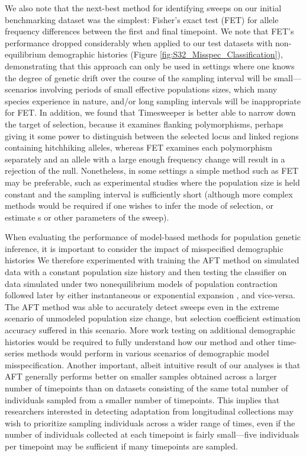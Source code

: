 We also note that the next-best method for identifying sweeps on our initial benchmarking dataset was the simplest: Fisher’s exact test (FET) for allele frequency differences between the first and final timepoint. We note that FET’s performance dropped considerably when applied to our test datasets with non-equilibrium demographic histories (Figure \ref{fig:S32_Misspec_Classification}), demonstrating that this approach can only be used in settings where one knows the degree of genetic drift over the course of the sampling interval will be small—scenarios involving periods of small effective populations sizes, which many species experience in nature, and/or long sampling intervals will be inappropriate for FET. In addition, we found that Timesweeper is better able to narrow down the target of selection, because it examines flanking polymorphisms, perhaps giving it some power to distinguish between the selected locus and linked regions containing hitchhiking alleles, whereas FET examines each polymorphism separately and an allele with a large enough frequency change will result in a rejection of the null. Nonetheless, in some settings a simple method such as FET may be preferable, such as experimental studies where the population size is held constant and the sampling interval is sufficiently short (although more complex methods would be required if one wishes to infer the mode of selection, or estimate s or other parameters of the sweep).

When evaluating the performance of model-based methods for population genetic inference, it is important to consider the impact of misspecified demographic histories \cite{moDomainadaptiveNeuralNetworks2023,schriderHICRobustIdentification2016} We therefore experimented with training the AFT method on simulated data with a constant population size history and then testing the classifier on data simulated under two nonequilibrium models of population contraction followed later by either instantaneous or exponential expansion \cite{gutenkunstInferringJointDemographic2009,marthAlleleFrequencySpectrum2004}, and vice-versa. The AFT method was able to accurately detect sweeps even in the extreme scenario of unmodeled population size change, but selection coefficient estimation accuracy suffered in this scenario. More work testing on additional demographic histories would be required to fully understand how our method and other time-series methods would perform in various scenarios of demographic model misspecification. Another important, albeit intuitive result of our analyses is that AFT generally performs better on smaller samples obtained across a larger number of timepoints than on datasets consisting of the same total number of individuals sampled from a smaller number of timepoints. This implies that researchers interested in detecting adaptation from longitudinal collections may wish to prioritize sampling individuals across a wider range of times, even if the number of individuals collected at each timepoint is fairly small—five individuals per timepoint may be sufficient if many timepoints are sampled.

